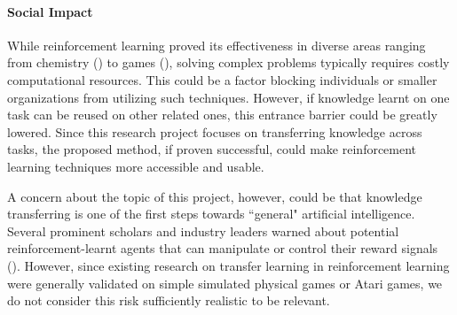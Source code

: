 \paragraph{Social Impact} While reinforcement learning proved its effectiveness in diverse areas ranging from chemistry (\cite{zhou2017optimizing}) to games (\cite{silver2017mastering}), solving complex problems typically requires costly computational resources. This could be a factor blocking individuals or smaller organizations from utilizing such techniques. However, if knowledge learnt on one task can be reused on other related ones, this entrance barrier could be greatly lowered. Since this research project focuses on transferring knowledge across tasks, the proposed method, if proven successful, could make reinforcement learning techniques more accessible and usable.

A concern about the topic of this project, however, could be that knowledge transferring is one of the first steps towards ``general" artificial intelligence. Several prominent scholars and industry leaders warned about potential reinforcement-learnt agents that can manipulate or control their reward signals (\cite{russell2016research}). However, since existing research on transfer learning in reinforcement learning were generally validated on simple simulated physical games or Atari games, we do not consider this risk sufficiently realistic to be relevant. 